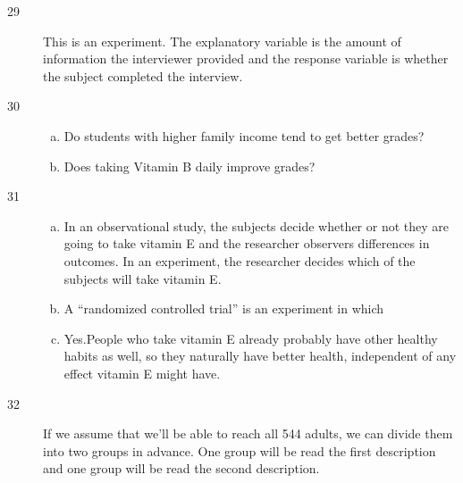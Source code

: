 \documentclass[letterpaper]{exam}
\begin{document}
  \ifprintanswers
    \begin{description}

      \item[29] 
        This is an experiment.  The explanatory variable is the amount of
        information the interviewer provided and the response variable is
        whether the subject completed the interview.

      \item[30]
        \begin{enumerate}[(a)]
          \item Do students with higher family income tend to get better grades?

          \item Does taking Vitamin B daily improve grades?
        \end{enumerate}

      \item[31]
        \begin{enumerate}[(a)]
          \item In an observational study, the subjects decide whether or not
            they are going to take vitamin E and the researcher observers
            differences in outcomes.  In an experiment, the researcher decides
            which of the subjects will take vitamin E.

          \item A ``randomized controlled trial'' is an experiment in which 

          \item Yes.People who take vitamin E already probably have other
            healthy habits as well, so they naturally have better health,
            independent of any effect vitamin E might have.
        \end{enumerate}

      \item[32] If we assume that we'll be able to reach all 544 adults, we can
        divide them into two groups in advance.  One group will be read the
        first description and one group will be read the second description.


\end{description}
\end{document}
